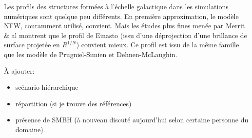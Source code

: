 
			Les profils des structures formées à l'échelle
			galactique dans les simulations numériques sont quelque
			peu différents. En première approximation, le modèle
			NFW, couramment utilisé, convient. Mais les études plus
			fines menée par Merrit \& al montrent que le profil de
			Einasto (issu d'une déprojection d'une brillance de
			surface projetée en $R^{1/N}$) convient mieux. Ce
			profil est issu de la même famille que les modèle de
			Prugniel-Simien et Dehnen-McLaughin.


			À ajouter:
			\begin{itemize}
				\item scénario hiérarchique
				\item répartition (si je trouve des références)
				\item présence de SMBH (à nouveau discuté aujourd'hui selon certaine personne du domaine).
			\end{itemize}

